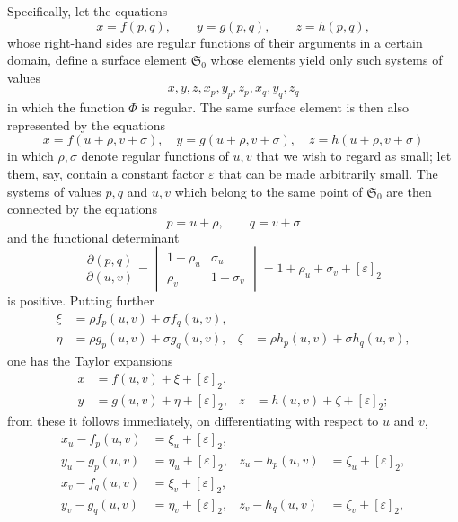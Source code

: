 \documentclass[11pt,a4paper,leqno]{article}
\begin{document}
Specifically, let the equations
\[
x=f(p,q),\qquad y=g(p,q),\qquad z=h(p,q),
\]
whose right-hand sides are regular functions of their arguments in a certain domain, define a surface element $\mathfrak{S}_0$ whose elements yield only such systems of values
\[
x,y,z,x_p,y_p,z_p,x_q,y_q,z_q
\]
in which the function $\Phi$ is regular. The same surface element is then also represented by the equations
\[
x=f(u+\rho,v+\sigma),\quad
y=g(u+\rho,v+\sigma),\quad
z=h(u+\rho,v+\sigma)
\]
in which $\rho,\sigma$ denote regular functions of $u,v$ that we wish to regard as small; let them, say, contain a constant factor $\varepsilon$ that can be made arbitrarily small. The systems of values $p,q$ and $u,v$ which belong to the same point of $\mathfrak{S}_0$ are then connected by the equations
\[
p=u+\rho,\qquad q=v+\sigma
\]
and the functional determinant
\[
\frac{\partial(p,q)}{\partial(u,v)}
=
\begin{vmatrix}
1+\rho_u & \sigma_u\\
\rho_v & 1+\sigma_v
\end{vmatrix}
=1+\rho_u+\sigma_v+[\varepsilon]_2
\]
is positive. Putting further
\[
\begin{aligned}
\xi&=\rho f_p(u,v)+\sigma f_q(u,v),\\
\eta&=\rho g_p(u,v)+\sigma g_q(u,v),
&\zeta&=\rho h_p(u,v)+\sigma h_q(u,v),
\end{aligned}
\]
one has the Taylor expansions
\[
\begin{aligned}
x&=f(u,v)+\xi+[\varepsilon]_2,\\
y&=g(u,v)+\eta+[\varepsilon]_2,
&z&=h(u,v)+\zeta+[\varepsilon]_2;
\end{aligned}
\]
from these it follows immediately, on differentiating with respect to $u$ and $v$,
\[
\begin{aligned}
x_u-f_p(u,v)&=\xi_u+[\varepsilon]_2,\\
y_u-g_p(u,v)&=\eta_u+[\varepsilon]_2,
&z_u-h_p(u,v)&=\zeta_u+[\varepsilon]_2,\\
x_v-f_q(u,v)&=\xi_v+[\varepsilon]_2,\\
y_v-g_q(u,v)&=\eta_v+[\varepsilon]_2,
&z_v-h_q(u,v)&=\zeta_v+[\varepsilon]_2,
\end{aligned}
\]
\end{document}

